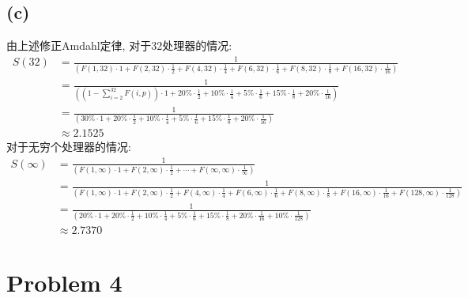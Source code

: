 \documentclass{article}
\begin{document}
\subsection*{(c)}
由上述修正Amdahl定律, 对于32处理器的情况:
\begin{align*}
    S(32) & = \frac{1}{\left(F(1, 32) \cdot 1 + F(2, 32) \cdot \frac{1}{2} + F(4, 32) \cdot \frac{1}{4} + F(6, 32) \cdot \frac{1}{6} + F(8, 32) \cdot \frac{1}{8} + F(16, 32) \cdot \frac{1}{16}\right)}        \\
          & = \frac{1}{\left(\left(1-\sum_{i=2}^{32}F(i, p)\right) \cdot 1 + 20\% \cdot \frac{1}{2} + 10\% \cdot \frac{1}{4} + 5\% \cdot \frac{1}{6} + 15\% \cdot \frac{1}{8} + 20\% \cdot \frac{1}{16}\right)} \\
          & = \frac{1}{\left(30\% \cdot 1 + 20\% \cdot \frac{1}{2} + 10\% \cdot \frac{1}{4} + 5\% \cdot \frac{1}{6} + 15\% \cdot \frac{1}{8} + 20\% \cdot \frac{1}{16}\right)}                                  \\
          & \approx2.1525
\end{align*}
对于无穷个处理器的情况:
\begin{align*}
    S(\infty) & = \frac{1}{\left(F(1, \infty) \cdot 1
        + F(2, \infty) \cdot \frac{1}{2}
        + \cdots
    + F(\infty, \infty) \cdot \frac{1}{\infty}\right)}                                                                                                                                                              \\
              & = \frac{1}{\left(F(1, \infty) \cdot 1
        + F(2, \infty) \cdot \frac{1}{2}
        + F(4, \infty) \cdot \frac{1}{4}
        + F(6, \infty) \cdot \frac{1}{6}
        + F(8, \infty) \cdot \frac{1}{8}
        + F(16, \infty) \cdot \frac{1}{16}
    + F(128, \infty) \cdot \frac{1}{128}\right)}                                                                                                                                                                    \\
              & = \frac{1}{\left(20\% \cdot 1 + 20\%  \cdot \frac{1}{2} + 10\%  \cdot \frac{1}{4} + 5\%  \cdot \frac{1}{6} + 15\%  \cdot \frac{1}{8} + 20\%  \cdot \frac{1}{16} + 10\%  \cdot \frac{1}{128}\right)} \\
              & \approx2.7370
\end{align*}

\section*{Problem 4}
\end{document}

